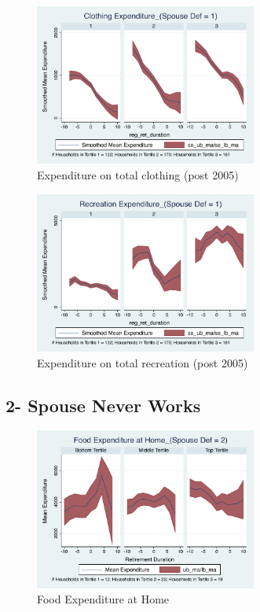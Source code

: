 \documentclass[11pt,onecolumn]{article}
\numberwithin{figure}{section}
\begin{document}
\begin{figure}[h]
	\caption{Expenditure on total clothing (post 2005)}
	\centering
	\includegraphics[width=0.65\textwidth]{../ConsumptionPostRetirement_by_SpouseDef_Cats/Smoothed/1/spouse_def_total_clothing_2005_real.pdf}
\end{figure}

\begin{figure}[h]
	\caption{Expenditure on total recreation (post 2005)}
	\centering
	\includegraphics[width=0.65\textwidth]{../ConsumptionPostRetirement_by_SpouseDef_Cats/Smoothed/1/spouse_def_total_recreation_2005_real.pdf}
\end{figure}

\clearpage

\subsection{2- Spouse Never Works}

\begin{figure}[h]
	\caption{Food Expenditure at Home}
	\centering
	\includegraphics[width=0.65\textwidth]{../ConsumptionPostRetirement_by_SpouseDef_Cats/Smoothed/2/spouse_def_total_foodexp_home_real.pdf}
\end{figure}
\end{document}
